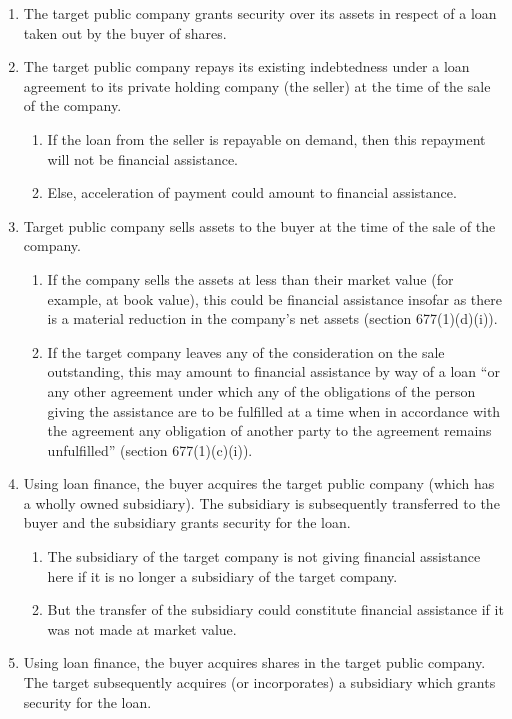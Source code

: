 \documentclass[
]{article}
\providecommand{\tightlist}{%
  \setlength{\itemsep}{0pt}\setlength{\parskip}{0pt}}
\begin{document}
\begin{enumerate}
\tightlist
\item
  The target public company grants security over its assets in respect
  of a loan taken out by the buyer of shares.
\item
  The target public company repays its existing indebtedness under a
  loan agreement to its private holding company (the seller) at the time
  of the sale of the company.

  \begin{enumerate}
  \tightlist
  \item
    If the loan from the seller is repayable on demand, then this
    repayment will not be financial assistance.
  \item
    Else, acceleration of payment could amount to financial assistance.
  \end{enumerate}
\item
  Target public company sells assets to the buyer at the time of the
  sale of the company.

  \begin{enumerate}
  \tightlist
  \item
    If the company sells the assets at less than their market value (for
    example, at book value), this could be financial assistance insofar
    as there is a material reduction in the company's net assets
    (section 677(1)(d)(i)).
  \item
    If the target company leaves any of the consideration on the sale
    outstanding, this may amount to financial assistance by way of a
    loan ``or any other agreement under which any of the obligations of
    the person giving the assistance are to be fulfilled at a time when
    in accordance with the agreement any obligation of another party to
    the agreement remains unfulfilled'' (section 677(1)(c)(i)).
  \end{enumerate}
\item
  Using loan finance, the buyer acquires the target public company
  (which has a wholly owned subsidiary). The subsidiary is subsequently
  transferred to the buyer and the subsidiary grants security for the
  loan.

  \begin{enumerate}
  \tightlist
  \item
    The subsidiary of the target company is not giving financial
    assistance here if it is no longer a subsidiary of the target
    company.
  \item
    But the transfer of the subsidiary could constitute financial
    assistance if it was not made at market value.
  \end{enumerate}
\item
  Using loan finance, the buyer acquires shares in the target public
  company. The target subsequently acquires (or incorporates) a
  subsidiary which grants security for the loan.


\end{enumerate}
\end{document}
